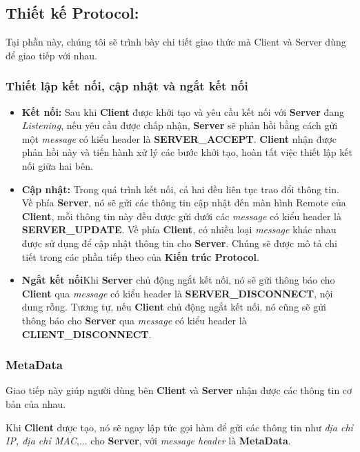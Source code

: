 \subsection{Thiết kế Protocol: }\label{subsec:Protocol}

Tại phần này, chúng tôi sẽ trình bày chi tiết giao thức mà Client và Server dùng để giao tiếp với nhau. 

\subsubsection{Thiết lập kết nối, cập nhật và ngắt kết nối}

\begin{itemize}
	\item \textbf{Kết nối: } Sau khi \textbf{Client} được khởi tạo và yêu cầu kết nối với \textbf{Server} đang \textit{Listening}, nếu yêu cầu được chấp nhận, \textbf{Server} sẽ phản hồi bằng cách gửi một \textit{message} có kiểu header là \textbf{SERVER\_ACCEPT}. \textbf{Client} nhận được phản hồi này và tiến hành xử lý các bước khởi tạo, hoàn tất việc thiết lập kết nối giữa hai bên.
	\item \textbf{Cập nhật: } Trong quá trình kết nối, cả hai đều liên tục trao đổi thông tin. Về phía \textbf{Server}, nó sẽ gửi các thông tin cập nhật đến màn hình Remote của \textbf{Client}, mỗi thông tin này đều được gửi dưới các \textit{message} có kiểu header là \textbf{SERVER\_UPDATE}. Về phía \textbf{Client}, có nhiều loại \textit{message} khác nhau được sử dụng để cập nhật thông tin cho \textbf{Server}. Chúng sẽ được mô tả chi tiết trong các phần tiếp theo của \textbf{Kiến trúc Protocol}.
	\item \textbf{Ngắt kết nối}Khi \textbf{Server} chủ động ngắt kết nối, nó sẽ gửi thông báo cho \textbf{Client} qua \textit{message} có kiểu header là \textbf{SERVER\_DISCONNECT}, nội dung rỗng. Tương tự, nếu \textbf{Client} chủ động ngắt kết nối, nó cũng sẽ gửi thông báo cho \textbf{Server} qua \textit{message} có kiểu header là \textbf{CLIENT\_DISCONNECT}.
\end{itemize}
	
\subsubsection{MetaData}

Giao tiếp này giúp người dùng bên \textbf{Client} và \textbf{Server} nhận được các thông tin cơ bản của nhau.

Khi \textbf{Client} được tạo, nó sẽ ngay lập tức gọi hàm để gửi các thông tin như \textit{địa chỉ IP, địa chỉ MAC},... cho \textbf{Server}, với \textit{message header} là \textbf{MetaData}.

